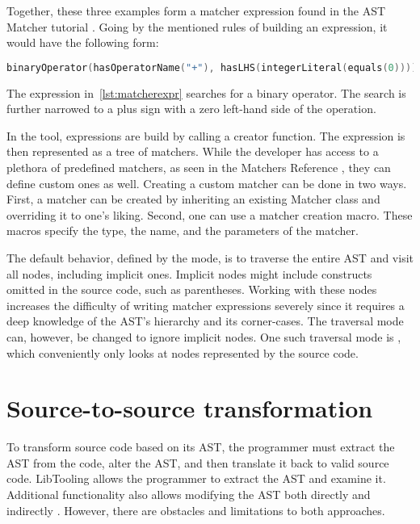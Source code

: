 Together, these three examples form a matcher expression found in
the AST Matcher tutorial \citep{matcherstutorial:online}. 
Going by the mentioned rules of building an expression, it would have 
the following form: 

\begin{lstlisting}[caption=Matcher expression., language=C++, 
label={lst:matcherexpr}, numbers=none]
binaryOperator(hasOperatorName("+"), hasLHS(integerLiteral(equals(0)))).
\end{lstlisting}

The expression in~\ref{lst:matcherexpr} searches for a binary operator. 
The search is further narrowed to a plus sign with a zero left-hand 
side of the operation.

In the tool, expressions are build by calling a creator function. 
The expression is then represented as a tree of matchers. 
While the developer has access to a plethora of predefined matchers, 
as seen in the Matchers Reference \citep{matchersreference:online}, 
they can define custom ones as well. 
Creating a custom matcher can be done in two ways. 
First, a matcher can be created by inheriting an existing Matcher class 
and overriding it to one's liking. 
Second, one can use a matcher creation macro. 
These macros specify the type, the name, and the parameters of the matcher.

The default behavior, defined by the  mode, is to traverse 
the entire AST and visit all nodes, including implicit ones. 
Implicit nodes might include constructs omitted in the source code, 
such as parentheses. 
Working with these nodes increases the difficulty of writing matcher 
expressions severely since it requires a deep knowledge of the AST's 
hierarchy and its corner-cases. 
The traversal mode can, however, be changed to ignore implicit nodes. 
One such traversal mode is , 
which conveniently only looks at nodes represented by the source code. 

\section{Source-to-source transformation}

To transform source code based on its AST, the programmer must extract 
the AST from the code, alter the AST, and then translate it back to valid 
source code. 
LibTooling allows the programmer to extract the AST and examine it. 
Additional functionality also allows modifying the AST both directly 
and indirectly \citep{sourcetosource:online}. 
However, there are obstacles and limitations to both approaches. 

